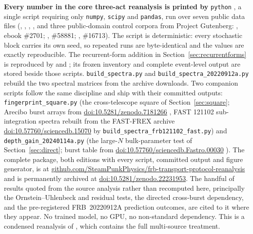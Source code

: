 \documentclass[11pt,a4paper]{article}
\providecommand{\doi}[1]{\href{https://doi.org/#1}{doi:#1}}
\begin{document}
\textbf{Every number in the core three-act reanalysis is printed by}
\texttt{python} , a single script requiring only \texttt{numpy},
\texttt{scipy} and \texttt{pandas}, run over seven public data files
(, ,
, , and three
public-domain control corpora from Project Gutenberg: ,
ebook \#2701; , \#58881;
, \#16713).
The script is deterministic: every stochastic block carries its own seed, so repeated
runs are byte-identical and the values are exactly reproducible.
The recurrent-form addition in Section~\ref{sec:recurrentforms} is reproduced by
 and
; its frozen inventory and
complete event-level output are stored beside those scripts.
\texttt{build\_spectra.py} and \texttt{build\_spectra\_20220912a.py} rebuild the two
spectral matrices from the archive downloads. Two companion scripts follow the same
discipline and ship with their committed outputs: \texttt{fingerprint\_square.py}
(the cross-telescope square of Section~\ref{sec:square}; Arecibo burst arrays from
\doi{10.5281/zenodo.7181266} \cite{hewitt2022}, FAST 121102 sub-integration spectra
rebuilt from the FAST-FREX archive \doi{10.57760/sciencedb.15070} by
\texttt{build\_spectra\_frb121102\_fast.py}) and \texttt{depth\_gain\_20240114a.py}
(the large-$N$ bulk-parameter test of Section~\ref{sec:direct}; burst table from
\doi{10.57760/sciencedb.Fastro.00030} \cite{zhangjs2025}). The complete package,
both editions with every script, committed output and figure generator, is at
\href{https://github.com/SteamPunkPhysics/frb-transport-protocol-reanalysis}{github.com/SteamPunkPhysics/frb-transport-protocol-reanalysis}
and is permanently archived at \doi{10.5281/zenodo.22231953}. The handful of results quoted from the
source analysis rather than recomputed here, principally the Ornstein--Uhlenbeck and
residual tests, the directed cross-burst dependency, and the pre-registered
FRB~20220912A prediction outcomes, are cited to it where they appear.
No trained model, no GPU, no non-standard dependency. This is a condensed reanalysis of
\cite{meucci2026}, which contains the full multi-source treatment.
\end{document}
